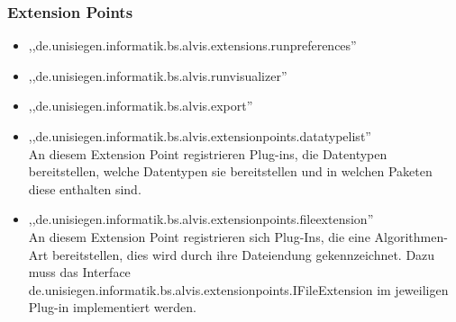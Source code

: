 \documentclass[10pt,a4paper,oneside]{scrbook}
\begin{document}
\subsubsection{Extension Points}
\begin{itemize}
 \item ,,de.unisiegen.informatik.bs.alvis.extensions.runpreferences''\\
 \item ,,de.unisiegen.informatik.bs.alvis.runvisualizer''\\
 \item ,,de.unisiegen.informatik.bs.alvis.export''\\
 \item ,,de.unisiegen.informatik.bs.alvis.extensionpoints.datatypelist''\\
	  An diesem Extension Point registrieren Plug-ins, die Datentypen bereitstellen,
	  welche Datentypen sie bereitstellen und in welchen Paketen diese enthalten sind.
 \item ,,de.unisiegen.informatik.bs.alvis.extensionpoints.fileextension''\\
	  An diesem Extension Point registrieren sich Plug-Ins, die eine Algorithmen-Art
	  bereitstellen, dies wird durch ihre Dateiendung gekennzeichnet. Dazu muss das Interface
	  de.\-unisiegen.\-informatik.\-bs.\-alvis.\-extension\-points.\-IFileExtension im jeweiligen
	  Plug-in implementiert werden.
\end{itemize}
\end{document}

